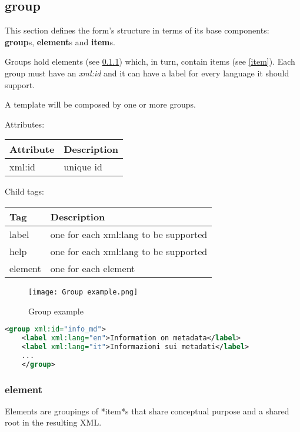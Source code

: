 	\subsection{group}
This section defines the form's structure in terms of its base components: \textbf{group}s, \textbf{element}s and \textbf{item}s.

Groups hold elements (see \ref{element}) which, in turn, contain items (see \ref{item}).
Each group must have an \textit{xml:id} and it can have a label for every language it should support.

A template will be composed by one or more groups.

Attributes:
\begin{center}
	\begin{tabular}{ | p{} | p{} | }
		\hline
		Attribute & Description \\ 
		\hline
		xml:id & unique id \\
		\hline
	\end{tabular}
\end{center}

Child tags:
\begin{center}
	\begin{tabular}{ | p{} | p{} | }
		\hline
		Tag & Description \\ 
		\hline
		label & one for each xml:lang to be supported \\
		help & one for each xml:lang to be supported \\
		\hline
		element & one for each element \\
		\hline
		
	\end{tabular}
\end{center}

\begin{figure}[h]
	\caption{Group example}
	\texttt{[image: Group example.png]}
	\centering
\end{figure}

\begin{lstlisting}[language=xml]
	<group xml:id="info_md">
	<label xml:lang="en">Information on metadata</label>
	<label xml:lang="it">Informazioni sui metadati</label>
	...
	</group>
\end{lstlisting}

\subsubsection{element} \label{element}
Elements are groupings of *item*s that share conceptual purpose and a shared root in the resulting XML.

